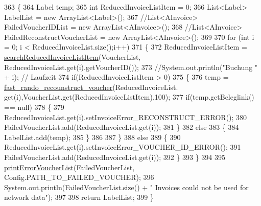 \begin{DoxyCode}
363     \{
364         Label temp;
365         \textcolor{keywordtype}{int} ReducedInvoiceListItem = 0;
366         List<Label> LabelList = \textcolor{keyword}{new} ArrayList<Label>();
367         \textcolor{comment}{//List<AInvoice> FailedVoucherIDList = new ArrayList<AInvoice>();}
368         \textcolor{comment}{//List<AInvoice> FailedReconstructVoucherList = new ArrayList<AInvoice>();}
369         
370         \textcolor{keywordflow}{for} (\textcolor{keywordtype}{int} i = 0; i < ReducedInvoiceList.size();i++)
371         \{
372             ReducedInvoiceListItem = \hyperlink{class_booking_1_1_c_s_v_booking_handler_a9748f34b648b985b61b702176a9d509f}{searchReducedInvoiceListItem}(VoucherList,
      ReducedInvoiceList.get(i).getVoucherID());
373             \textcolor{comment}{//System.out.println("Buchung " + i); // Laufzeit}
374             \textcolor{keywordflow}{if}(ReducedInvoiceListItem > 0)
375             \{
376                 temp = \hyperlink{class_booking_1_1_c_s_v_booking_handler_a2df02bd1c70d30d48a113aadc025fece}{fast\_rando\_recounstruct\_voucher}(ReducedInvoiceList.
      get(i),VoucherList.get(ReducedInvoiceListItem),100);
377                 \textcolor{keywordflow}{if}(temp.getBeleglink() == null)
378                 \{
379                     ReducedInvoiceList.get(i).setInvoiceError\_RECONSTRUCT\_ERROR();
380                     FailedVoucherList.add(ReducedInvoiceList.get(i));
381                 \}
382                 \textcolor{keywordflow}{else}
383                 \{
384                     LabelList.add(temp);
385                 \}
386                 
387             \}
388             \textcolor{keywordflow}{else}
389             \{
390                 ReducedInvoiceList.get(i).setInvoiceError\_VOUCHER\_ID\_ERROR();
391                 FailedVoucherList.add(ReducedInvoiceList.get(i));
392             \}
393         \}
394         
395         \hyperlink{class_booking_1_1_c_s_v_booking_handler_ad5b394199d9f3ef0478393b7fa139d16}{printErrorVoucherList}(FailedVoucherList, Config.PATH\_TO\_FAILED\_VOUCHER);
396         System.out.println(FailedVoucherList.size() + \textcolor{stringliteral}{" Invoices could not be used for network data"});
397         
398         \textcolor{keywordflow}{return} LabelList;
399     \}   
\end{DoxyCode}
